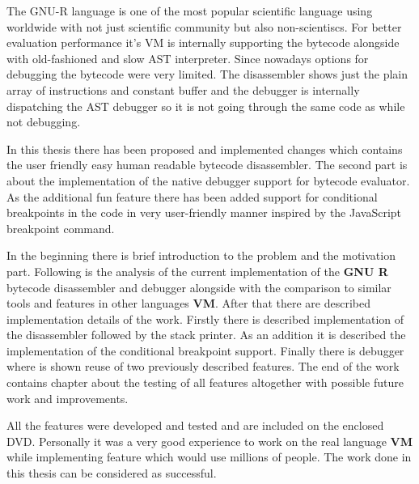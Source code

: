 \documentclass[thesis=M,english]{FITthesis}[2018/10/20]
\begin{document}
\begin{conclusion}

The GNU-R language is one of the most popular scientific language using worldwide with not just scientific community but also non-scientiscs. For better evaluation performance it's VM is internally supporting the bytecode alongside with old-fashioned and slow AST interpreter. Since nowadays options for debugging the bytecode were very limited. The disassembler shows just the plain array of instructions and constant buffer and the debugger is internally dispatching the AST debugger so it is not going through the same code as while not debugging. 

In this thesis there has been proposed and implemented changes which contains the user friendly easy human readable bytecode disassembler. The second part is about the implementation of the native debugger support for bytecode evaluator. As the additional fun feature there has been added support for conditional breakpoints in the code in very user-friendly manner inspired by the JavaScript breakpoint command.

In the beginning there is brief introduction to the problem and the motivation part. Following is the analysis of the current implementation of the \textbf{GNU R} bytecode disassembler and debugger alongside with the comparison to similar tools and features in other languages \textbf{VM}. After that there are described implementation details of the work. Firstly there is described implementation of the disassembler followed by the stack printer. As an addition it is described the implementation of the conditional breakpoint support. Finally there is debugger where is shown reuse of two previously described features. The end of the work contains chapter about the testing of all features altogether with possible future work and improvements.

All the features were developed and tested and are included on the enclosed DVD. Personally it was a very good experience to work on the real language \textbf{VM} while implementing feature which would use millions of people. The work done in this thesis can be considered as successful.

\end{conclusion}



\nocite{*}


\appendix
\end{document}
